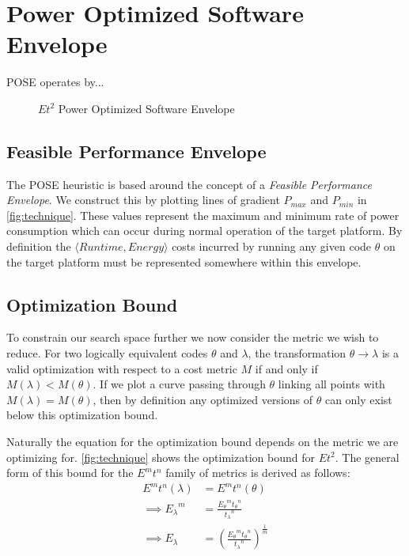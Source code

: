 \section{Power Optimized Software Envelope}
\label{sec:pose}

POSE operates by...

\begin{figure}
\centering

\caption{$Et^2$ Power Optimized Software Envelope}
\label{fig:technique}
\end{figure}

\subsection{Feasible Performance Envelope}
The POSE heuristic is based around the concept of a \emph{Feasible Performance Envelope}.
We construct this by plotting lines of gradient $P_{max}$ and $P_{min}$ in \autoref{fig:technique}.
These values represent the maximum and minimum rate of power consumption which can occur during normal operation of the target platform.
By definition the $\langle Runtime, Energy\rangle$ costs incurred by running any given code $\theta$ on the target platform must be represented somewhere within this envelope.

\subsection{Optimization Bound}
To constrain our search space further we now consider the metric we wish to reduce.
For two logically equivalent codes $\theta$ and $\lambda$, the transformation ${\theta \to \lambda}$ is a valid optimization with respect to a cost metric $M$ if and only if ${M(\lambda) < M(\theta)}$.
If we plot a curve passing through $\theta$ linking all points with ${M(\lambda) = M(\theta)}$, then by definition any optimized versions of $\theta$ can only exist below this optimization bound.

Naturally the equation for the optimization bound depends on the metric we are optimizing for.
\autoref{fig:technique} shows the optimization bound for $Et^2$.
The general form of this bound for the $E^mt^n$ family of metrics is derived as follows:
\begin{align}
E^mt^n(\lambda) &= E^mt^n(\theta) \nonumber \\
\implies {E_\lambda}^m &= \frac{{E_\theta}^m{t_\theta}^n}{{t_\lambda}^n} \nonumber \\
\implies E_\lambda &= (\frac{{E_\theta}^m{t_\theta}^n}{{t_\lambda}^n})^\frac{1}{m}
\label{eq:optimization}
\end{align}


